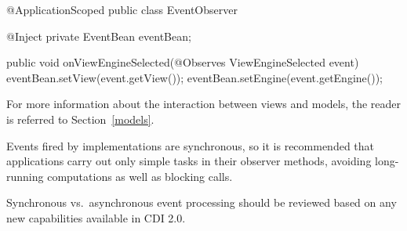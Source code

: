 \begin{listing}{1}
@ApplicationScoped
public class EventObserver {

    @Inject
    private EventBean eventBean;

    public void onViewEngineSelected(@Observes ViewEngineSelected event) {
        eventBean.setView(event.getView());
        eventBean.setEngine(event.getEngine());
    }
}
\end{listing}

For more information about the interaction between views and models, the reader
is referred to Section~\ref{models}. 

Events fired by implementations are synchronous,
so it is recommended that applications carry out only simple tasks in 
their observer methods, avoiding long-running computations as well as blocking calls.

\begin{ednote}
Synchronous vs.~asynchronous event processing should be reviewed 
based on any new capabilities available in CDI 2.0.
\end{ednote}
